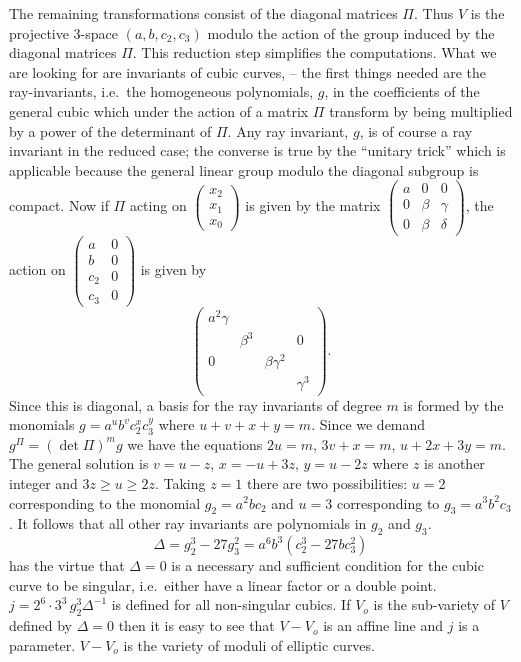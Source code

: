 The remaining transformations consist of the diagonal matrices $\Pi$.
Thus $V$ is the projective 3-space $(a,b,c_{2},c_{3})$ modulo the action
of the group induced by the diagonal matrices $\Pi$. This reduction step
simplifies the computations. What we are looking for are invariants of
cubic curves, -- the first things needed are the ray-invariants, i.e.\
the homogeneous polynomials, $g$, in the coefficients of the general
cubic which under the action of a matrix $\Pi$ transform by being
multiplied by a power of the determinant of $\Pi$. Any ray invariant, $g$,
is of course a ray invariant in the reduced case; the converse is true by
the ``unitary trick'' which is applicable because the general linear
group modulo the diagonal subgroup is compact. Now if $\Pi$ acting on
$\begin{pmatrix}x_{2}\\ x_{1}\\ x_{0}\end{pmatrix}$ is given by the
matrix $\begin{pmatrix}a&0&0\\ 0&\beta&\gamma\\ 0&\beta&\delta
\end{pmatrix}$, the action on $\begin{pmatrix}a&0\\ b&0\\ c_{2}&0\\
c_{3}&0\end{pmatrix}$ is given by
\[
\begin{pmatrix}
a^{2}\gamma &&&\\
&\beta^{3}&&0\\
0&&\beta\gamma^{2}&\\
&&&\gamma^{3}
\end{pmatrix}.
\]
Since this is diagonal, a basis for the ray invariants of degree $m$ is
formed by the monomials $g=a^{u}b^{v}c_{2}^{x}c_{3}^{y}$ where
$u+v+x+y=m$. Since we demand $g^{\Pi}=(\det\Pi)^{m}g$ we have the
equations $2u=m$, $3v+x=m$, $u+2x+3y=m$. The general solution is
$v=u-z$, $x=-u+3z$, $y=u-2z$ where $z$ is another integer and
$3z\geq u\geq 2z$. Taking $z=1$ there are two possibilities:
$u=2$ corresponding to the monomial $g_{2}=a^{2}bc_{2}$ and $u=3$
corresponding to $g_{3}=a^{3}b^{2}c_{3}$. It follows that all other ray
invariants are polynomials in $g_{2}$ and $g_{3}$.
\[
\Delta=g_{2}^{3}-27g_{3}^{2}=a^{6}b^{3}(c_{2}^{3}-27bc_{3}^{2})
\]
has the virtue that $\Delta=0$ is a necessary and sufficient condition
for the cubic curve to be singular, i.e.\ either have a linear factor or
a double point. $j=2^{6}\cdot 3^{3}\,g_{2}^{3}\Delta^{-1}$ is defined for
all non-singular cubics. If $V_{o}$ is the sub-variety of $V$ defined by
$\Delta=0$ then it is easy to see that $V-V_{o}$ is an affine line and
$j$ is a parameter. $V-V_{o}$ is the variety of moduli of elliptic
curves.

